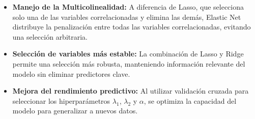 \documentclass[
  letterpaper,
  DIV=11,
  numbers=noendperiod]{scrreprt}
\begin{document}
\begin{tcolorbox}[enhanced jigsaw, leftrule=.75mm, breakable, colbacktitle=quarto-callout-note-color!10!white, bottomrule=.15mm, colframe=quarto-callout-note-color-frame, toprule=.15mm, colback=white, coltitle=black, bottomtitle=1mm, left=2mm, title=\textcolor{quarto-callout-note-color}{\faInfo}\hspace{0.5em}{Propiedades Clave}, opacityback=0, arc=.35mm, opacitybacktitle=0.6, toptitle=1mm, titlerule=0mm, rightrule=.15mm]

\begin{itemize}
\item
  \textbf{Manejo de la Multicolinealidad:} A diferencia de Lasso, que
  selecciona solo una de las variables correlacionadas y elimina las
  demás, Elastic Net distribuye la penalización entre todas las
  variables correlacionadas, evitando una selección arbitraria.
\item
  \textbf{Selección de variables más estable:} La combinación de Lasso y
  Ridge permite una selección más robusta, manteniendo información
  relevante del modelo sin eliminar predictores clave.
\item
  \textbf{Mejora del rendimiento predictivo:} Al utilizar validación
  cruzada para seleccionar los hiperparámetros \(\lambda_1\),
  \(\lambda_2\) y \(\alpha\), se optimiza la capacidad del modelo para
  generalizar a nuevos datos.
\end{itemize}

\end{tcolorbox}
\end{document}
